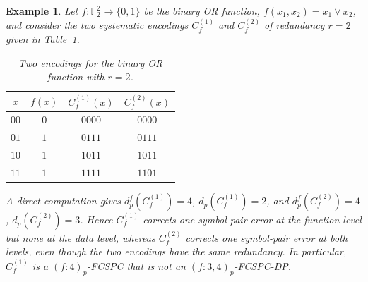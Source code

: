 \documentclass[11pt,draftclsnofoot,journal,onecolumn]{IEEEtran}
\newtheorem{example}{Example}
\begin{document}
    \begin{example}
\label{ex:or-function}
Let $f : \mathbb{F}_2^2 \to \{0,1\}$ be the binary OR function,
$f(x_1,x_2) = x_1 \vee x_2$, and consider the two systematic encodings
$C_f^{(1)}$ and $C_f^{(2)}$ of redundancy $r = 2$ given in Table~\ref{tab:or-example}.

\begin{table}[t]
\centering
\caption{Two encodings for the binary OR function with $r = 2$.}
\label{tab:or-example}
\renewcommand{\arraystretch}{1.3}
\begin{tabular}{cccc}
\toprule
$x$ & $f(x)$ & $C^{(1)}_f(x)$ & $C^{(2)}_f(x)$ \\
\midrule
$00$ & $0$ & $0000$ & $0000$ \\
$01$ & $1$ & $0111$ & $0111$ \\
$10$ & $1$ & $1011$ & $1011$ \\
$11$ & $1$ & $1111$ & $1101$ \\
\bottomrule
\end{tabular}
\end{table}

A direct computation gives
$d_p^f(C_f^{(1)}) = 4$, $d_p(C_f^{(1)}) = 2$, and
$d_p^f(C_f^{(2)}) = 4$, $d_p(C_f^{(2)}) = 3$.
Hence $C_f^{(1)}$ corrects one symbol-pair error at the function level but none at the
data level, whereas $C_f^{(2)}$ corrects one symbol-pair error at both levels, even
though the two encodings have the same redundancy. In particular, $C_f^{(1)}$ is a
$(f : 4)_p$-FCSPC that is not an $(f : 3, 4)_p$-FCSPC-DP.
\end{example}
 
        
\end{document}
